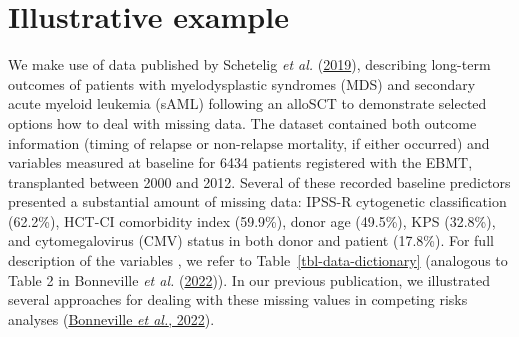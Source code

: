 \documentclass[
  letterpaper,
  DIV=11,
  numbers=noendperiod]{scrreprt}
\begin{document}
\hypertarget{illustrative-example}{%
\section{Illustrative example}\label{illustrative-example}}

We make use of data published by Schetelig \emph{et al.}
(\protect\hyperlink{ref-scheteligLateTreatmentrelatedMortality2019}{2019}),
describing long-term outcomes of patients with myelodysplastic syndromes
(MDS) and secondary acute myeloid leukemia (sAML) following an alloSCT
to demonstrate selected options how to deal with missing data. The
dataset contained both outcome information (timing of relapse or
non-relapse mortality, if either occurred) and variables measured at
baseline for 6434 patients registered with the EBMT, transplanted
between 2000 and 2012. Several of these recorded baseline predictors
presented a substantial amount of missing data: IPSS-R cytogenetic
classification (62.2\%), HCT-CI comorbidity index (59.9\%), donor age
(49.5\%), KPS (32.8\%), and cytomegalovirus (CMV) status in both donor
and patient (17.8\%). For full description of the variables , we refer
to Table~\ref{tbl-data-dictionary} (analogous to Table 2 in Bonneville
\emph{et al.}
(\protect\hyperlink{ref-bonnevilleMultipleImputationCausespecific2022}{2022})).
In our previous publication, we illustrated several approaches for
dealing with these missing values in competing risks analyses
(\protect\hyperlink{ref-bonnevilleMultipleImputationCausespecific2022}{Bonneville
\emph{et al.}, 2022}).
\end{document}
